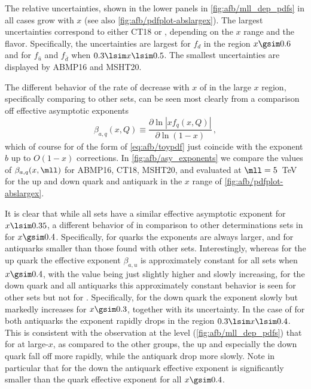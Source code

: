 The relative \pdfs uncertainties, shown in the lower panels in
\cref{fig:afb/mll_dep_pdfs} in all cases grow with $x$ (see also 
\cref{fig:afb/pdfplot-abslargex}).
%
The largest \pdf uncertainties correspond to either CT18 or , 
depending on the $x$ range and the \pdf flavor.
%
Specifically, the  uncertainties are largest for $f_d$ in the
region $x\gsim 0.6$ 
and for $f_{\bar{u}}$ and $f_{\bar{d}}$ when $0.3 \lsim x \lsim 0.5$.
%
The smallest \pdf uncertainties are displayed by ABMP16 and  MSHT20.

The different behavior of the rate of decrease with $x$ of
\pdfs  in the large $x$ region, specifically comparing 
to other \pdf sets, can  be seen most clearly from a comparison off
effective asymptotic exponents~\cite{Ball:2016spl}
\begin{equation}
  \beta_{a,q}(x,Q)\equiv\frac{\partial \ln|xf_q(x,Q)|}{\partial \ln(1-x)}\,,
  \label{eq:afb/beta_asy}
\end{equation}
which of course for \pdfs of the form of \cref{eq:afb/toypdf} just
coincide with the exponent $b$ up to $O(1-x)$ corrections.
In \cref{fig:afb/asy_exponents} we compare
the values of $\beta_{a,q}(x,\mll)$
for ABMP16, CT18, MSHT20, and  evaluated at $\mll=5$~TeV
for the up and down quark and antiquark \pdfs in the  $x$ range of
\cref{fig:afb/pdfplot-abslargex}.

It is clear that while all \pdf
sets have a similar effective asymptotic exponent for $x\lsim 0.35$, a
different behavior of  in comparison to other
determinations sets in for $x\gsim 0.4$.
%
Specifically, for quarks the  exponents are always larger,
and for antiquarks smaller than those found with other \pdf
sets.
%
Interestingly, whereas for the up quark the
effective exponent $\beta_{a,u}$ is approximately constant for all
\pdf sets when  $x\gsim 0.4$, with the  value being just
slightly higher and slowly increasing, for the down quark and all
antiquarks this approximately constant behavior is seen for other
\pdf sets but not for .
%
Specifically, for the  down quark
the exponent slowly but markedly increases for $x\gsim 0.3$, together 
with its uncertainty.
%
In the case of  for both antiquarks the exponent
rapidly drops  in the region $0.3 \lsim x \lsim 0.4$.
%
This is consistent with the observation at the \pdf level
(\cref{fig:afb/mll_dep_pdfs})  that for 
at large-$x$, as compared to the other groups,
the up and especially the down  quark fall off more rapidly, while
the antiquark \pdfs drop more slowly. Note in particular that for
the down \pdf the antiquark effective exponent is significantly
smaller than the quark effective exponent for all $x\gsim0.4$.

